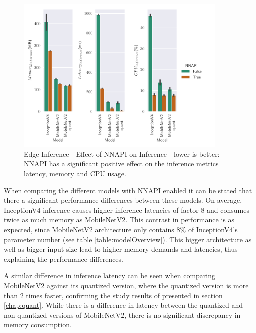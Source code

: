 \begin{figure}[!htb]
\centering
\includegraphics[width=0.9\textwidth]{./Bilder/single_plots/edge_inference_plots/NNAPI_behavior.pdf}
\caption[Edge Inference - Effect of NNAPI on Inference]{Edge Inference - Effect of NNAPI on Inference - lower is better: NNAPI has a significant positive effect on the inference metrics latency, memory and CPU usage.}
\label{fig:NNAPI}
\end{figure}

When comparing the different models with NNAPI enabled it can be stated that there a significant performance differences between these models.
On average, InceptionV4 inference causes higher inference latencies of factor $8$ and consumes twice as much memory as MobileNetV2.
This contrast in performance is as expected, since MobileNetV2 architecture only contains $8\%$ of InceptionV4's parameter number (see table \ref{table:modelOverview}).
This bigger architecture as well as bigger input size lead to higher memory demands and latencies, thus explaining the performance differences.

A similar difference in inference latency can be seen when comparing MobileNetV2 against its quantized version, where the quantized version is more than $2$ times faster, confirming the study results of \cite{Quantizing} presented in section \ref{chap:quant}.
While there is a difference in latency between the quantized and non quantized versions of MobileNetV2, there is no significant discrepancy in memory consumption.



